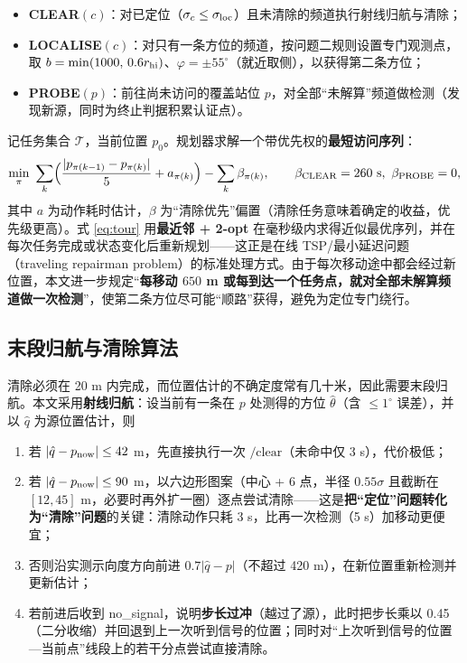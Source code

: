 \begin{itemize}
  \item \textbf{CLEAR}$(c)$：对已定位（$\sigma_c\le\sigma_{\rm loc}$）且未清除的频道执行射线归航与清除；
  \item \textbf{LOCALISE}$(c)$：对只有一条方位的频道，按问题二规则设置专门观测点，取 $b=\min(1000,\,0.6r_{\rm hi})$、$\varphi=\pm55^{\circ}$（就近取侧），以获得第二条方位；
  \item \textbf{PROBE}$(p)$：前往尚未访问的覆盖站位 $p$，对全部“未解算”频道做检测（发现新源，同时为终止判据积累认证点）。
\end{itemize}

记任务集合 $\mathcal T$，当前位置 $p_0$。规划器求解一个带优先权的\textbf{最短访问序列}：
\begin{equation}
\min_{\pi}\ \sum_{k}\Bigl(\frac{|p_{\pi(k-1)}-p_{\pi(k)}|}{5}+a_{\pi(k)}\Bigr)
-\sum_{k}\beta_{\pi(k)},
\qquad \beta_{\text{CLEAR}}=260\ \text{s},\ \beta_{\text{PROBE}}=0,
\label{eq:tour}
\end{equation}
其中 $a$ 为动作耗时估计，$\beta$ 为“清除优先”偏置（清除任务意味着确定的收益，优先级更高）。式 \eqref{eq:tour} 用\textbf{最近邻 + 2-opt} 在毫秒级内求得近似最优序列，并在每次任务完成或状态变化后重新规划——这正是在线 TSP/最小延迟问题（traveling repairman problem）的标准处理方式\cite{ausiello2001,afrati1986,blum1994,psaraftis1995}。由于每次移动途中都会经过新位置，本文进一步规定“\textbf{每移动 $650$ m 或每到达一个任务点，就对全部未解算频道做一次检测}”，使第二条方位尽可能“顺路”获得，避免为定位专门绕行。

\subsection{末段归航与清除算法}

清除必须在 20 m 内完成，而位置估计的不确定度常有几十米，因此需要末段归航。本文采用\textbf{射线归航}：设当前有一条在 $p$ 处测得的方位 $\hat\theta$（含 $\le1^{\circ}$ 误差），并以 $\hat q$ 为源位置估计，则

\begin{enumerate}
  \item 若 $|\hat q-p_{\rm now}|\le42$ m，先直接执行一次 $\text{/clear}$（未命中仅 3 s），代价极低；
  \item 若 $|\hat q-p_{\rm now}|\le90$ m，以六边形图案（中心 + 6 点，半径 $0.55\sigma$ 且截断在 $[12,45]$ m，必要时再外扩一圈）逐点尝试清除——这是\textbf{把“定位”问题转化为“清除”问题}的关键：清除动作只耗 3 s，比再一次检测（5 s）加移动更便宜；
  \item 否则沿实测示向度方向前进 $0.7|\hat q-p|$（不超过 420 m），在新位置重新检测并更新估计；
  \item 若前进后收到 no\_signal，说明\textbf{步长过冲}（越过了源），此时把步长乘以 0.45（二分收缩）并回退到上一次听到信号的位置；同时对“上次听到信号的位置—当前点”线段上的若干分点尝试直接清除。
\end{enumerate}

